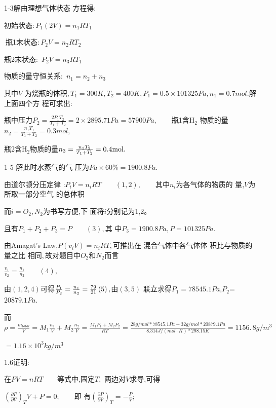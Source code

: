 \documentclass{ctexart}
\begin{document}
1-3解\qquad 由理想气体状态%
方程得$:$

\qquad 初始状态$:P_{1}(2V)=n_{1}RT_{1}$

$\ $瓶1末状态$:P_{2}V=n_{2}RT_{2}$

\qquad 瓶2末状态$:$ $P_{2}V=n_{3}RT_{1}$

\qquad 物质的量守恒关系$:$ $%
n_{1}=n_{2}+n_{3}$

其中$V$ 为烧瓶的体积$%
,T_{1}=300\unit{K},T_{2}=400\unit{K},P_{1}=0.5\times 101325\unit{Pa}%
,n_{1}=0.7\unit{mol}.$解上面四个方%
程可求出$:$

瓶中压力$P_{2}=\frac{2P_{1}T_{2}}{T_{1}+T_{2}}%
=2\times 2895.71\unit{Pa}=57900\unit{Pa},\qquad $瓶1含H$_{2}$%
物质的量$n_{2}=\frac{n_{1}T_{1}}{T_{1}+T_{2}}=0.3%
\unit{mol},$

瓶2含H$_{2}$物质的量$n_{3}=\frac{%
n_{1}T_{2}}{T_{1}+T_{2}}=0.4\unit{mol}.$

1-5 解\qquad 此时水蒸气的气%
压为$\unit{Pa}\times 60\%=1900.8\unit{Pa}.$

\qquad 由道尔顿分压定律%
:\qquad $P_{i}V=n_{i}RT\qquad \left( 1,2\right) ,\qquad $其中$%
n_{i}$为各气体的物质的%
量,$V$为所取一部分空气%
的总体积

而$i=O_{2},N_{2}$为书写方便,下%
面将$i$分别记为1,2。

且有\qquad $P_{1}+P_{2}+P_{3}=P\qquad \left( 3\right) ,$其%
中\qquad $P_{3}=1900.8\unit{Pa},P=101325Pa.$

由Amagat's Law,$P(v_{i}V)=n_{i}RT,$可推出在%
混合气体中各气体体%
积比与物质的量之比%
相同$,$故对题目中$O_{2}$和$%
N_{2}$而言

$\frac{v_{1}}{v_{2}}=\frac{n_{1}}{n_{2}}\qquad \left( 4\right) ,$

由$\left( 1,2,4\right) $可得$\frac{P_{1}}{P_{2}}=\frac{%
n_{1}}{n_{2}}=\frac{79}{21}\left( 5\right) ,$由$\left( 3,5\right) $%
联立求得\qquad $P_{1}=78545.1\unit{Pa}$,$P_{2}$=$%
20879.1\unit{Pa}$.

而$\rho =\frac{m_{total}}{V}=M_{1}\frac{n_{1}}{V}+M_{2}\frac{n_{2}}{V}=%
\frac{M_{1}P_{1}+M_{2}P_{2}}{RT}=\frac{28\unit{g}/\unit{mol}\ast 78545.1%
\unit{Pa}+32\unit{g}/\unit{mol}\ast 20879.1\unit{Pa}}{8.314\unit{J}/\left( 
\unit{mol}\cdot \unit{K}\right) \ast 298.15\unit{K}}=\allowbreak
1156.\,\allowbreak 8\unit{g}/\unit{m}^{3}$

$=1.16\times 10^{3}\unit{kg}/\unit{m}^{3}$

1.6\qquad 证明:

在\qquad $PV=nRT\qquad $等式中,固定$T,$%
两边对$V$求导,可得

$\left( \frac{\partial P}{\partial V}\right) _{T}V+P=0;\qquad $即%
有\qquad $\left( \frac{\partial P}{\partial V}\right) _{T}=-\frac{P}{V}%
;$
\end{document}
